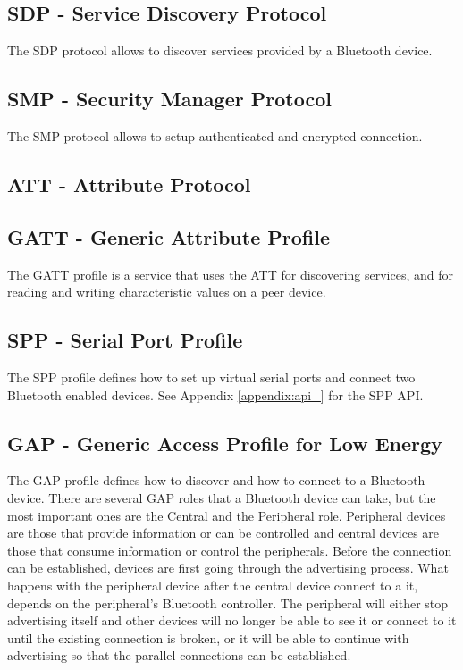 \subsection{SDP - Service Discovery Protocol}
The SDP protocol allows to discover services provided by a Bluetooth device. 

\subsection{SMP - Security Manager Protocol }
The SMP protocol allows to setup authenticated and encrypted connection.

\subsection{ATT - Attribute Protocol}

\subsection{GATT -  Generic Attribute Profile}
The GATT profile is a service that uses the ATT for discovering services, and for reading and writing characteristic values on a peer device. 

\subsection{SPP - Serial Port Profile}
The SPP profile defines how to set up virtual serial ports and connect two Bluetooth enabled devices. See Appendix \ref{appendix:api_} for the SPP API.

\subsection{GAP - Generic Access Profile for Low Energy}
The GAP profile defines how to discover and how to connect to a Bluetooth device. There are several GAP roles that a Bluetooth device can take, but the most important ones are the Central and the Peripheral role. Peripheral devices are those that provide information or can be controlled and central devices are those that consume information or control the peripherals. Before the connection can be established, devices are first going through the advertising process. What happens with the peripheral device after the central device connect to a it, depends on the peripheral's Bluetooth controller. The peripheral will either stop advertising itself and other devices will no longer be able to see it or connect to it until the existing connection is broken, or it will be able to continue with advertising so that the parallel connections can be established.
